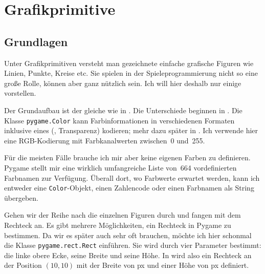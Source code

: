 \newpage
\section{Grafikprimitive}\label{secGrafikprimitive}
\subsection{Grundlagen}
Unter Grafikprimitiven versteht man gezeichnete einfache grafische Figuren wie Linien, Punkte, Kreise etc. Sie spielen in der Spieleprogrammierung nicht so eine große Rolle, können aber ganz nützlich sein. Ich will hier deshalb nur einige vorstellen. 


Der Grundaufbau ist der gleiche wie in . Die Unterschiede beginnen in . Die Klasse \texttt{pygame.Color} kann Farbinformationen in verschiedenen Formaten inklusive eines  (, Transparenz) kodieren; mehr dazu später in . Ich verwende hier eine RGB-Kodierung mit Farbkanalwerten zwischen~0 und~255. 

Für die meisten Fälle brauche ich mir aber keine eigenen Farben zu definieren. Pygame stellt mir eine wirklich umfangreiche Liste von~664 vordefinierten Farbnamen zur Verfügung. Überall dort, wo Farbwerte erwartet werden, kann ich entweder eine \texttt{Color}-Objekt, einen Zahlencode oder einen Farbnamen als String übergeben.

\begin{figure}%
	\begin{center}%
		\vspace{-1cm}%
	\end{center}%
\end{figure}%
Gehen wir der Reihe nach die einzelnen Figuren durch und fangen mit dem Rechteck an. Es gibt mehrere Möglichkeiten, ein Rechteck in Pygame zu bestimmen. Da wir es später auch sehr oft brauchen, möchte ich hier schonmal die Klasse \texttt{pygame.rect.Rect} einführen. Sie wird durch vier Parameter bestimmt: die linke obere Ecke, seine Breite und seine Höhe. In  wird also ein Rechteck an der Position $(10,10)$ mit der Breite von \unit[20]{px} und einer Höhe von \unit[30]{px} definiert. 

